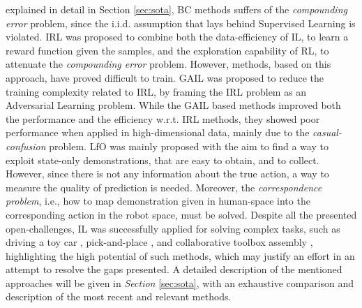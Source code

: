 explained in detail in Section \ref{sec:sota}, BC methods suffers of the \textit{compounding error} problem, since the
i.i.d. assumption that lays behind Supervised Learning is violated. IRL was proposed to combine both the
data-efficiency of IL, to learn a reward function given the samples, and the exploration capability of RL, to attenuate
the \textit{compounding error} problem. However, methods, based on this approach, have proved difficult to train. GAIL was proposed to reduce
the training complexity related to IRL, by framing the IRL problem as an Adversarial Learning problem. While the GAIL based methods 
improved both the performance and the efficiency w.r.t. IRL methods, they showed poor performance when applied in
high-dimensional data, mainly due to the \textit{casual-confusion} problem. LfO was mainly proposed with
the aim to find a way to exploit state-only demonstrations, that are easy to obtain, and to collect. However, since
there is not any information about the true action, a way to measure the quality of prediction is needed. Moreover, the
\textit{correspondence problem}, i.e., how to map demonstration given in human-space into the corresponding action in the robot
space, must be solved.     
\newline Despite all the presented open-challenges, IL was successfully applied for solving complex tasks, such as
driving a toy car \cite{codevilla2018end_to_end}, pick-and-place \cite{zhang2018deep_vr_teleoperation}, and collaborative toolbox
assembly \cite{maeda2017probabilistic}, highlighting the high potential of such methods, which may justify an effort in
an attempt to resolve the gaps presented. A detailed description of the mentioned approaches will be given in
\textit{Section} \ref{sec:sota}, with an exhaustive comparison and description of the most recent and relevant methods.


